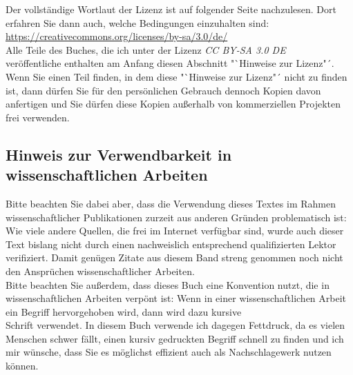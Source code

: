 Der vollständige Wortlaut der Lizenz ist auf folgender Seite nachzulesen. Dort erfahren Sie dann auch, welche Bedingungen einzuhalten sind:\\

\url{https://creativecommons.org/licenses/by-sa/3.0/de/}\\

Alle Teile des Buches, die ich unter der Lizenz \emph{CC BY-SA 3.0 DE}\\
veröffentliche enthalten am Anfang diesen Abschnitt "`Hinweise zur Lizenz"´. Wenn Sie einen Teil finden, in dem diese "`Hinweise zur Lizenz"´ nicht zu finden ist, dann dürfen Sie für den persönlichen Gebrauch dennoch Kopien davon anfertigen und Sie dürfen diese Kopien außerhalb von kommerziellen Projekten frei verwenden.\\

\subsection*{Hinweis zur Verwendbarkeit in wissenschaftlichen Arbeiten}

Bitte beachten Sie dabei aber, dass die Verwendung dieses Textes im Rahmen wissenschaftlicher Publikationen zurzeit aus anderen Gründen problematisch ist: Wie viele andere Quellen, die frei im Internet verfügbar sind, wurde auch dieser Text bislang nicht durch einen nachweislich entsprechend qualifizierten Lektor verifiziert. Damit genügen Zitate aus diesem Band streng genommen noch nicht den Ansprüchen wissenschaftlicher Arbeiten.\\

Bitte beachten Sie außerdem, dass dieses Buch eine Konvention nutzt, die in wissenschaftlichen Arbeiten verpönt ist: Wenn in einer wissenschaftlichen Arbeit ein Begriff hervorgehoben wird, dann wird dazu kursive\\
Schrift verwendet. In diesem Buch verwende ich dagegen Fettdruck, da es vielen Menschen schwer fällt, einen kursiv gedruckten Begriff schnell zu finden und ich mir wünsche, dass Sie es möglichst effizient auch als Nachschlagewerk nutzen können.